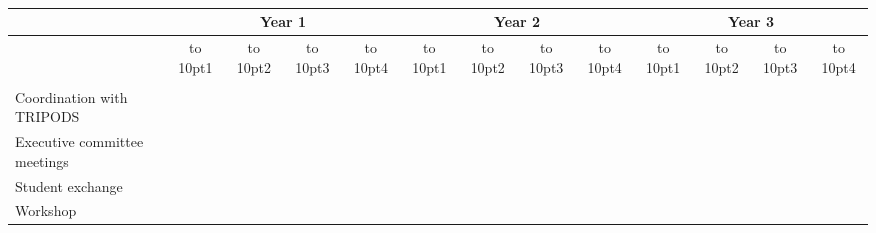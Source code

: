 \def\graycell{\cellcolor[RGB]{200,200,200}}
\def\acell{\cellcolor[rgb]{.98,.81,.69}}
\def\bcell{\cellcolor[rgb]{0.54, 0.81, 0.94}}
\def\ccell{\cellcolor[rgb]{0.98, 0.91, 0.71}}
\def\dcell{\cellcolor[rgb]{0.64, 0.76, 0.68}}
\def\ecell{\cellcolor[rgb]{0.96, 0.76, 0.76}}
\def\g{}
\def\g{\graycell}
\def\a{\acell}
\def\b{\bcell}
\def\c{\ccell}
\def\d{\dcell}
\def\e{\ecell}
\def\yale{\bcell}
\def\brown{\acell}
\def\both{\bcell}


\def\topic#1{\multicolumn{13}{c}{}\\
  \multicolumn{1}{l}{\bf #1 } & \multicolumn{12}{c}{} \\[3pt] \hline}
\def\numb#1{\hbox to 10pt{\hfill #1\hfill}}
\def\ffour{\numb{4}}
\def\three{\numb{3}}
\def\two{\numb{2}}
\def\one{\numb{1}}
\def\four{\multicolumn{1}{c|}{\ffour}}
\def\col{C}
\def\stan{S}
\def\rice{R}

\noindent
\begin{small}
\begin{center}
\mbox{\ }\vskip20pt
\setlength{\tabcolsep}{3pt}    
\renewcommand{\arraystretch}{1.2}
\begin{tabular}{|>{\arraybackslash}m{2.5in}|c|c|c|c||c|c|c|c||c|c|c|c|}
\hline 
\multirow{2}{*}{\small \bf Activity} & \multicolumn{4}{c}{\bf
  Year 1} \vline & \multicolumn{4}{c}{\bf Year 2} \vline &
\multicolumn{4}{c|}{\bf Year 3} \\[3pt] \cline{2-13}
& \one & \two & \three & \four & \one & \two & \three & \four & \one & \two & \three & \four \\ \hline


\multicolumn{13}{c}{}\\[-12pt]
\hline

Coordination with TRIPODS & & \brown & & & & \brown & & & & \brown & & \\ \hline
Executive committee meetings & \b & \b & \b & \b & \b & \b & \b & \b & \b & \b & \b & \b \\ \hline
Student exchange & & & \brown & & & & \yale & & & & \yale & \\ \hline
Workshop &  &  &  & \yale &  &  &  & \brown & & & & \brown \\ \hline
\end{tabular}
\end{center}
\end{small}


